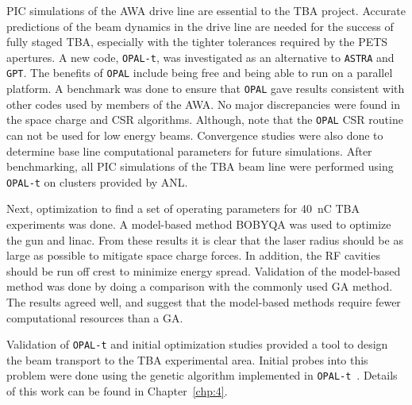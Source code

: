 
PIC simulations of the AWA drive line are essential to the TBA project. 
Accurate predictions of the beam dynamics in the drive line are needed for the 
success of fully staged TBA, especially with the tighter tolerances required by the PETS apertures.
A new code, \verb|OPAL-t|, was investigated as an alternative to \verb|ASTRA| and \verb|GPT|. 
The benefits of \verb|OPAL| include being free and being able to run on a parallel platform.
A benchmark was done to ensure that \verb|OPAL| gave results consistent with other codes used by members of the AWA.
No major discrepancies were found in the space charge and CSR algorithms.
Although, note that the \verb|OPAL| CSR routine can not be used for low energy beams.
Convergence studies were also done to determine base line computational 
parameters for future simulations.
After benchmarking, all PIC simulations of the TBA beam line were performed using \verb|OPAL-t| on clusters provided by ANL.

Next, optimization to find a set of operating parameters for
\SI{40}{nC} TBA experiments was done. A model-based method BOBYQA was used to optimize the gun and linac. 
From these results it is clear that the laser radius should be as large as possible to mitigate space charge forces.
In addition, the RF cavities should be run off crest to minimize energy spread.
Validation of the model-based method was done by doing a comparison with the commonly used GA method. 
The results agreed well, and suggest that the model-based methods require fewer computational resources than a GA. 

Validation of \verb|OPAL-t| and initial optimization studies provided a tool 
to design the beam transport to the TBA experimental area.  
Initial probes into this problem were done using the genetic algorithm
implemented in \verb|OPAL-t|~\cite{optpilot}. Details of this work can be found in Chapter~\ref{chp:4}.





